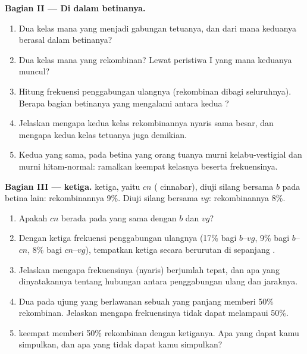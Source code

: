 \begin{problem}
\medskip
\noindent\textbf{Bagian II --- Di dalam  betinanya.}
\begin{enumerate}[resume]
  \item Dua kelas mana yang menjadi gabungan tetuanya, dan dari mana
        keduanya berasal dalam  betinanya?
  \item Dua kelas mana yang rekombinan? Lewat peristiwa  I yang
        mana keduanya muncul?
  \item Hitung frekuensi penggabungan ulangnya (rekombinan dibagi
        seluruhnya). Berapa bagian  betinanya yang mengalami
         antara kedua ?
  \item Jelaskan mengapa kedua kelas rekombinannya nyaris sama besar,
        dan mengapa kedua kelas tetuanya juga demikian.
  \item Kedua  yang sama, pada betina yang orang tuanya murni
        kelabu-vestigial dan murni hitam-normal: ramalkan keempat
        kelasnya beserta frekuensinya.
\end{enumerate}

\medskip
\noindent\textbf{Bagian III ---  ketiga.}
 ketiga, yaitu $cn$ ( cinnabar), diuji silang bersama $b$ pada
betina lain: rekombinannya 9\%. Diuji silang bersama $vg$:
rekombinannya 8\%.
\begin{enumerate}[resume]
  \item Apakah $cn$ berada pada  yang sama dengan $b$ dan $vg$?
  \item Dengan ketiga frekuensi penggabungan ulangnya (17\% bagi
        $b$--$vg$, 9\% bagi $b$--$cn$, 8\% bagi $cn$--$vg$), tempatkan
        ketiga  secara berurutan di sepanjang .
  \item Jelaskan mengapa frekuensinya (nyaris) berjumlah tepat, dan apa
        yang dinyatakannya tentang hubungan antara penggabungan ulang
        dan jaraknya.
  \item Dua  pada ujung yang berlawanan sebuah  yang panjang
        memberi 50\% rekombinan. Jelaskan mengapa frekuensinya tidak
        dapat melampaui 50\%.
  \item {} keempat memberi 50\% rekombinan dengan ketiganya. Apa yang
        dapat kamu simpulkan, dan apa yang tidak dapat kamu simpulkan?
\end{enumerate}


\end{problem}
